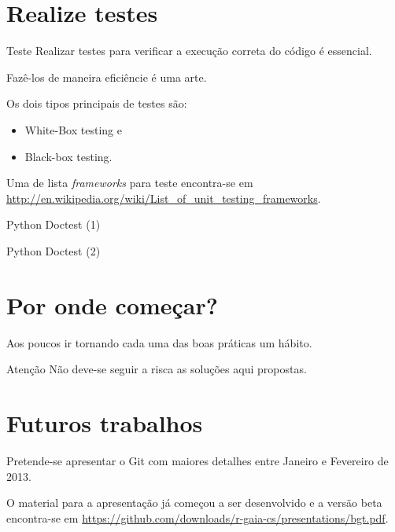 \documentclass[11pt]{beamer}
\begin{document}
\section{Realize testes}
\begin{frame}{Teste}
    Realizar testes para verificar a execução correta do código é essencial.
    
    Fazê-los de maneira eficiêncie é uma arte.

    \pause
    Os dois tipos principais de testes são:
    \begin{itemize}
        \item White-Box testing e
        \item Black-box testing.
    \end{itemize}

    \pause
    Uma de lista \textit{frameworks} para teste encontra-se em
    \url{http://en.wikipedia.org/wiki/List_of_unit_testing_frameworks}.
\end{frame}

\begin{frame}[fragile]{Python Doctest (1)}
    \begin{example}
        
    \end{example}
\end{frame}

\begin{frame}[fragile]{Python Doctest (2)}
    \begin{example}[Continuação]
        
    \end{example}
\end{frame}

\section{Por onde começar?}
\begin{frame}
    Aos poucos ir tornando cada uma das boas práticas um hábito.
    \begin{block}{Atenção}
        Não deve-se seguir a risca as soluções aqui propostas.
    \end{block}
\end{frame}

\section{Futuros trabalhos}
\begin{frame}
    Pretende-se apresentar o Git com maiores detalhes entre Janeiro e Fevereiro
    de 2013.

    O material para a apresentação já começou a ser desenvolvido e a versão
    beta encontra-se em
    \url{https://github.com/downloads/r-gaia-cs/presentations/bgt.pdf}.
\end{frame}
\end{document}
